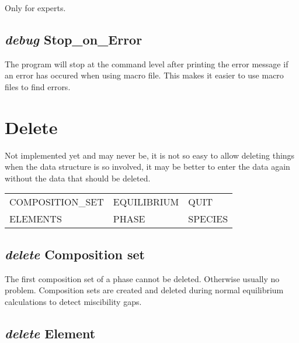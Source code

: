 \documentclass[12pt]{article}
\begin{document}
Only for experts.

\subsection{{\em debug} Stop\_on\_Error}

The program will stop at the command level after printing the error
message if an error has occured when using macro file.  This makes it
easier to use macro files to find errors.

\section{Delete }

Not implemented yet and may never be, it is not so easy to allow
deleting things when the data structure is so involved, it may be
better to enter the data again without the data that should be
deleted.

\begin{tabular}{lll}
 COMPOSITION\_SET & EQUILIBRIUM &     QUIT\\
 ELEMENTS         & PHASE        &    SPECIES\\
\end{tabular}

\subsection{{\em delete} Composition set}

The first composition set of a phase cannot be deleted.  Otherwise
usually no problem.  Composition sets are created and deleted during
normal equilibrium calculations to detect miscibility gaps.

\subsection{{\em delete} Element}
\end{document}
